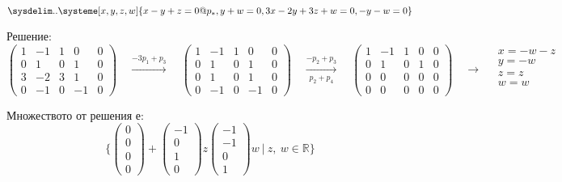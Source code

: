 \documentclass{subfiles}
\begin{document}
\begin{equation*}
    \sysdelim..\systeme[x,y,z,w]{
        x - y + z = 0@p_{*},
        y + w = 0,
        3x - 2y + 3z + w = 0,
        -y - w = 0
    }
\end{equation*}

\noindent Решение:
\begin{equation*}
    \left(
        \begin{array}{ cccc|c }
            1 & -1 & 1 &  0 & 0 \\
            0 & 1  & 0 &  1 & 0 \\
            3 & -2 & 3 &  1 & 0 \\
            0 & -1 & 0 & -1 & 0
        \end{array}
    \right)
    \quad
    \overset{-3p_{1}+p_{3}}{{\longrightarrow}}
    \quad
    \left(
        \begin{array}{ cccc|c }
            1 & -1 & 1 &  0 & 0 \\
            0 &  1 & 0 &  1 & 0 \\
            0 &  1 & 0 &  1 & 0 \\
            0 & -1 & 0 & -1 & 0
        \end{array}
    \right)
    \quad
    \overset{-p_{2}+p_{3}}{\underset{p_{2}+p_{4}}{\longrightarrow}}
    \quad
    \left(
        \begin{array}{ cccc|c }
            1 & -1 & 1 &  0 & 0 \\
            0 &  1 & 0 &  1 & 0 \\
            0 &  0 & 0 &  0 & 0 \\
            0 &  0 & 0 &  0 & 0
        \end{array}
    \right)
    \quad
    \longrightarrow
    \quad
    \begin{array}{ c }
        x = -w - z \\
        y = -w \\
        z = z \\
        w = w \\
    \end{array}
\end{equation*}

\noindent Множеството от решения е:
\begin{equation*}
    \{
        \left(\begin{array}{ c } 0 \\ 0 \\ 0 \\ 0 \end{array}\right) +
        \left(\begin{array}{ c } -1 \\ 0 \\ 1 \\ 0 \end{array}\right) z
        \left(\begin{array}{ c } -1 \\ -1 \\ 0 \\ 1 \end{array}\right) w
        \ |\ z,\ w \in \mathbb{R}
    \}
\end{equation*}
\end{document}
